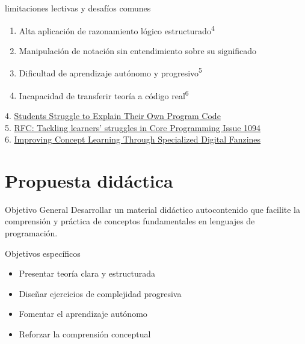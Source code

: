 \documentclass[11pt]{beamer}
\begin{document}
\begin{frame}{limitaciones lectivas y desafíos comunes}
	\begin{enumerate}
		\item{Alta aplicación de razonamiento lógico estructurado}\textsuperscript{4} \\ [1.2em]
		\item{Manipulación de notación sin entendimiento sobre su significado} \\ [1.2em]
		\item{Dificultad de aprendizaje autónomo y progresivo}\textsuperscript{5} \\ [1.2em] 
		\item{Incapacidad de transferir teoría a código real}\textsuperscript{6} \\ [1.2em]
	\end{enumerate}
	
	\vspace{1em}
	{\tiny
		4. \href{https://arxiv.org/abs/2104.06710?utm_source=chatgpt.com}{Students Struggle to Explain Their Own Program Code} \\ [0.2em] 
		5. \href{https://github.com/ossu/computer-science/issues/1094?utm_source=chatgpt.com}{RFC: Tackling learners' struggles in Core Programming Issue 1094} \\ [0.2em]
		6. \href{https://digibuo.uniovi.es/dspace/bitstream/handle/10651/63076/2102.11147.pdf?sequence=1&utm_source=chatgpt.com}{Improving Concept Learning Through Specialized Digital Fanzines} \\ [0.2em]
	}
\end{frame}


\section{Propuesta didáctica}

\begin{frame}{Objetivo General}
	Desarrollar un material didáctico autocontenido que facilite la comprensión y práctica de conceptos fundamentales en lenguajes de programación.
	
\end{frame}



\begin{frame}{Objetivos específicos}
	\begin{itemize}
		\item{Presentar teoría clara y estructurada} \\ [1em]
		\item{Diseñar ejercicios de complejidad progresiva} \\ [1em]
		\item{Fomentar el aprendizaje autónomo} \\ [1em]
		\item{Reforzar la comprensión conceptual} \\ [1em]
	\end{itemize}
\end{frame}
\end{document}

